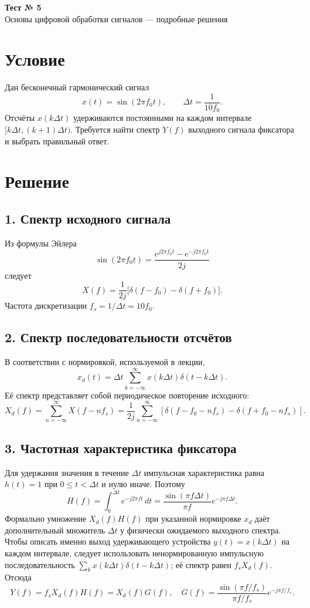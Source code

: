 \documentclass[12pt,a4paper]{article}
\begin{document}
\clearpage
\begin{center}
{\Huge\bfseries Тест № 5}\\[8pt]
{\large Основы цифровой обработки сигналов — подробные решения}
\end{center}
\vspace{8mm}
\section*{Условие}
Дан бесконечный гармонический сигнал
\[
x(t)=\sin(2\pi f_0t),\qquad \Delta t=\frac{1}{10f_0}.
\]
Отсчёты $x(k\Delta t)$ удерживаются постоянными на каждом интервале
$[k\Delta t,(k+1)\Delta t)$. Требуется найти спектр $Y(f)$ выходного
сигнала фиксатора и выбрать правильный ответ.

\section*{Решение}
\subsection*{1. Спектр исходного сигнала}
Из формулы Эйлера
\[
\sin(2\pi f_0t)=\frac{e^{j2\pi f_0t}-e^{-j2\pi f_0t}}{2j}
\]
следует
\[
X(f)=\frac{1}{2j}\bigl[\delta(f-f_0)-\delta(f+f_0)\bigr].
\]
Частота дискретизации $f_s=1/\Delta t=10f_0$.

\subsection*{2. Спектр последовательности отсчётов}
В соответствии с нормировкой, используемой в лекции,
\[
x_d(t)=\Delta t\sum_{k=-\infty}^{\infty}x(k\Delta t)\delta(t-k\Delta t).
\]
Её спектр представляет собой периодическое повторение исходного:
\[
X_d(f)=\sum_{n=-\infty}^{\infty}X(f-nf_s)
=\frac{1}{2j}\sum_{n=-\infty}^{\infty}
\left[\delta(f-f_0-nf_s)-\delta(f+f_0-nf_s)\right].
\]

\subsection*{3. Частотная характеристика фиксатора}
Для удержания значения в течение $\Delta t$ импульсная характеристика
равна $h(t)=1$ при $0\le t<\Delta t$ и нулю иначе. Поэтому
\[
H(f)=\int_0^{\Delta t}e^{-j2\pi ft}\,dt
=\frac{\sin(\pi f\Delta t)}{\pi f}e^{-j\pi f\Delta t}.
\]
Формально умножение $X_d(f)H(f)$ при указанной нормировке $x_d$
даёт дополнительный множитель $\Delta t$ у физически ожидаемого
выходного спектра. Чтобы описать именно выход удерживающего устройства
$y(t)=x(k\Delta t)$ на каждом интервале, следует использовать
ненормированную импульсную последовательность
$\sum_k x(k\Delta t)\delta(t-k\Delta t)$; её спектр равен
$f_s X_d(f)$. Отсюда
\[
Y(f)=f_sX_d(f)H(f)=X_d(f)G(f),\quad
G(f)=\frac{\sin(\pi f/f_s)}{\pi f/f_s}e^{-j\pi f/f_s}.
\]
\end{document}

